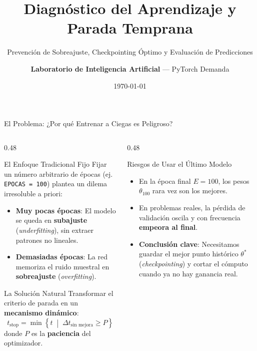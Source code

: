\documentclass[10pt,aspectratio=169]{beamer}
\title{Diagnóstico del Aprendizaje y Parada Temprana}
\subtitle{Prevención de Sobreajuste, Checkpointing Óptimo y Evaluación de Predicciones}
\author{\textbf{Laboratorio de Inteligencia Artificial} --- PyTorch Demanda}
\date{\today}
\institute{Deep Learning \& Modelado Predictivo (\texttt{red\_neuronal.py})}
\begin{document}
\begin{frame}
  \titlepage
\end{frame}

\begin{frame}{El Problema: ¿Por qué Entrenar a Ciegas es Peligroso?}
  \begin{columns}[T]
    \begin{column}{0.48\textwidth}
      \begin{block}{El Enfoque Tradicional Fijo}
        \scriptsize
        Fijar un número arbitrario de épocas (ej. \texttt{EPOCAS = 100}) plantea un dilema irresoluble a priori:
        \begin{itemize}
          \item \textbf{Muy pocas épocas}: El modelo se queda en \textbf{subajuste} (\textit{underfitting}), sin extraer patrones no lineales.
          \item \textbf{Demasiadas épocas}: La red memoriza el ruido muestral en \textbf{sobreajuste} (\textit{overfitting}).
        \end{itemize}
      \end{block}

      \vspace{-0.1cm}
      \begin{block}{La Solución Natural}
        \scriptsize
        Transformar el criterio de parada en un \textbf{mecanismo dinámico}:
        \[
          t_{\text{stop}} = \min \left\{ t \;\middle|\; \Delta t_{\text{sin mejora}} \ge P \right\}
        \]
        donde $P$ es la \textbf{paciencia} del optimizador.
      \end{block}
    \end{column}

    \begin{column}{0.48\textwidth}
      \begin{alertblock}{Riesgos de Usar el Último Modelo}
        \scriptsize
        \begin{itemize}
          \item En la época final $E=100$, los pesos $\theta_{100}$ rara vez son los mejores.
          \item En problemas reales, la pérdida de validación oscila y con frecuencia \textbf{empeora al final}.
          \item \textbf{Conclusión clave}: Necesitamos guardar el mejor punto histórico $\theta^*$ (\textit{checkpointing}) y cortar el cómputo cuando ya no hay ganancia real.
        \end{itemize}
      \end{alertblock}
    \end{column}
  \end{columns}
\end{frame}
\end{document}
